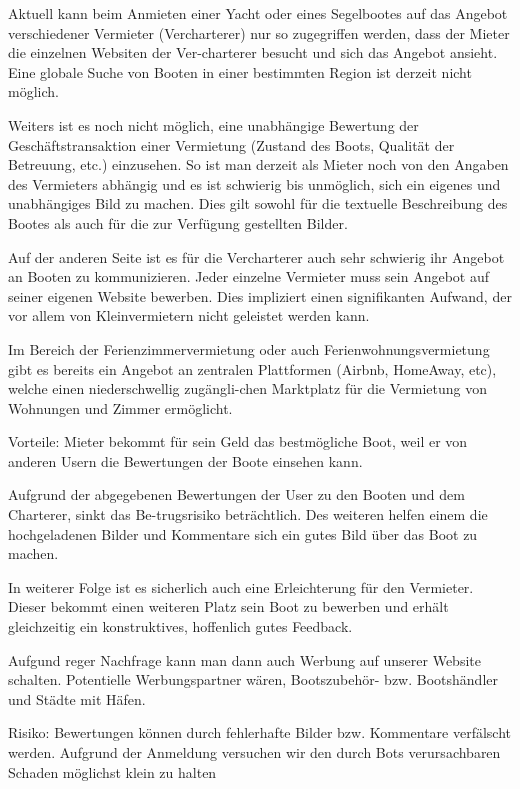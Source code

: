 \documentclass[12pt]{article}
\theoremstyle{definition}
\begin{document}
	Aktuell kann beim Anmieten einer Yacht oder eines Segelbootes auf das Angebot verschiedener Vermieter (Vercharterer) nur so zugegriffen werden, dass der Mieter die einzelnen Websiten der Ver-charterer besucht und sich das Angebot ansieht. Eine globale Suche von Booten in einer bestimmten Region ist derzeit nicht möglich.
	
	Weiters ist es noch nicht möglich, eine unabhängige Bewertung der Geschäfts\-trans\-aktion einer Vermietung (Zustand des Boots, Qualität der Betreuung, etc.) einzusehen. So ist man derzeit als Mieter noch von den Angaben des Vermieters abhängig und es ist schwierig bis unmöglich, sich ein eigenes und unabhängiges Bild zu machen. Dies gilt sowohl für die textuelle Beschreibung des Bootes als auch für die zur Verfügung gestellten Bilder.
	
	Auf der anderen Seite ist es für die Vercharterer auch sehr schwierig ihr Angebot an Booten zu kommunizieren. Jeder einzelne Vermieter muss sein Angebot auf seiner eigenen Website bewerben. Dies impliziert einen signifikanten Aufwand, der vor allem von Kleinvermietern nicht geleistet werden kann.
	
	Im Bereich der Ferienzimmervermietung oder auch Ferienwohnungsvermietung gibt es bereits ein Angebot an zentralen Plattformen (Airbnb, HomeAway, etc), welche einen niederschwellig zugängli-chen Marktplatz für die Vermietung von Wohnungen und Zimmer ermöglicht.
	
	Vorteile:
	Mieter bekommt für sein Geld das bestmögliche Boot, weil er von anderen Usern die Bewertungen der Boote einsehen kann.
	
	Aufgrund der abgegebenen Bewertungen der User zu den Booten und dem Charterer, sinkt das Be-trugsrisiko beträchtlich. Des weiteren helfen einem die hochgeladenen Bilder und Kommentare sich ein gutes Bild über das Boot zu machen.
	
	In weiterer Folge ist es sicherlich auch eine Erleichterung für den Vermieter. Dieser bekommt einen weiteren Platz sein Boot zu bewerben und erhält gleichzeitig ein konstruktives, hoffenlich gutes Feedback.
	
	Aufgund reger Nachfrage kann man dann auch Werbung auf unserer Website schalten. Potentielle Werbungspartner wären, Bootszubehör- bzw. Bootshändler und Städte mit Häfen.
	
	Risiko:
	Bewertungen können durch fehlerhafte Bilder bzw. Kommentare verfälscht werden. Aufgrund der Anmeldung versuchen wir den durch Bots verursachbaren Schaden möglichst klein zu halten	
\end{document}
